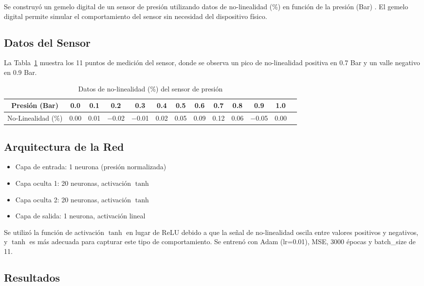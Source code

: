 \documentclass[fleqn,10pt]{SelfArx}
\begin{document}
Se construy\'o un gemelo digital de un sensor de presi\'on utilizando datos de no-linealidad (\%) en funci\'on de la presi\'on (Bar) \cite{gemelo2021}. El gemelo digital permite simular el comportamiento del sensor sin necesidad del dispositivo f\'isico.

\subsection{Datos del Sensor}

La Tabla~\ref{tab:sensor} muestra los 11 puntos de medici\'on del sensor, donde se observa un pico de no-linealidad positiva en 0.7 Bar y un valle negativo en 0.9 Bar.

\begin{table}[!htbp]
	\caption{Datos de no-linealidad (\%) del sensor de presi\'on}
	\centering
	\begin{tabular}{ccccccccccccc}
		\toprule
		Presi\'on (Bar) & 0.0 & 0.1 & 0.2 & 0.3 & 0.4 & 0.5 & 0.6 & 0.7 & 0.8 & 0.9 & 1.0 \\
		\midrule
		No-Linealidad (\%) & 0.00 & 0.01 & $-$0.02 & $-$0.01 & 0.02 & 0.05 & 0.09 & 0.12 & 0.06 & $-$0.05 & 0.00 \\
		\bottomrule
	\end{tabular}
	\label{tab:sensor}
\end{table}

\subsection{Arquitectura de la Red}

\begin{itemize}[noitemsep]
	\item Capa de entrada: 1 neurona (presi\'on normalizada)
	\item Capa oculta 1: 20 neuronas, activaci\'on $\tanh$
	\item Capa oculta 2: 20 neuronas, activaci\'on $\tanh$
	\item Capa de salida: 1 neurona, activaci\'on lineal
\end{itemize}

Se utiliz\'o la funci\'on de activaci\'on $\tanh$ en lugar de ReLU debido a que la se\~nal de no-linealidad oscila entre valores positivos y negativos, y $\tanh$ es m\'as adecuada para capturar este tipo de comportamiento. Se entren\'o con Adam (lr=0.01), MSE, 3000 \'epocas y batch\_size de 11.

\subsection{Resultados}
\end{document}
